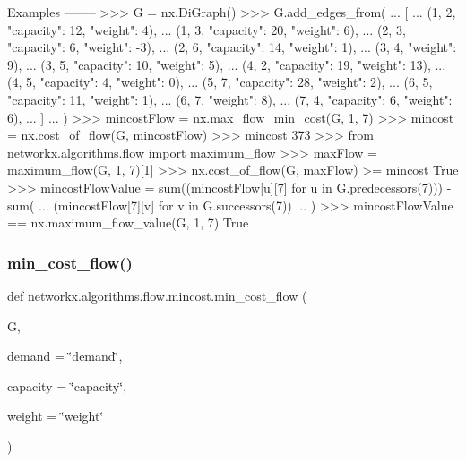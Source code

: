 \begin{DoxyVerb}
Examples
--------
>>> G = nx.DiGraph()
>>> G.add_edges_from(
...     [
...         (1, 2, {"capacity": 12, "weight": 4}),
...         (1, 3, {"capacity": 20, "weight": 6}),
...         (2, 3, {"capacity": 6, "weight": -3}),
...         (2, 6, {"capacity": 14, "weight": 1}),
...         (3, 4, {"weight": 9}),
...         (3, 5, {"capacity": 10, "weight": 5}),
...         (4, 2, {"capacity": 19, "weight": 13}),
...         (4, 5, {"capacity": 4, "weight": 0}),
...         (5, 7, {"capacity": 28, "weight": 2}),
...         (6, 5, {"capacity": 11, "weight": 1}),
...         (6, 7, {"weight": 8}),
...         (7, 4, {"capacity": 6, "weight": 6}),
...     ]
... )
>>> mincostFlow = nx.max_flow_min_cost(G, 1, 7)
>>> mincost = nx.cost_of_flow(G, mincostFlow)
>>> mincost
373
>>> from networkx.algorithms.flow import maximum_flow
>>> maxFlow = maximum_flow(G, 1, 7)[1]
>>> nx.cost_of_flow(G, maxFlow) >= mincost
True
>>> mincostFlowValue = sum((mincostFlow[u][7] for u in G.predecessors(7))) - sum(
...     (mincostFlow[7][v] for v in G.successors(7))
... )
>>> mincostFlowValue == nx.maximum_flow_value(G, 1, 7)
True\end{DoxyVerb}
 \mbox{\label{namespacenetworkx_1_1algorithms_1_1flow_1_1mincost_a891a006d4dc407fcf160c6d6be7e66d4}} 
\subsubsection{\texorpdfstring{min\+\_\+cost\+\_\+flow()}{min\_cost\_flow()}}
{\footnotesize\ttfamily def networkx.\+algorithms.\+flow.\+mincost.\+min\+\_\+cost\+\_\+flow (\begin{DoxyParamCaption}\item[{}]{G,  }\item[{}]{demand = {\ttfamily \char`\"{}demand\char`\"{}},  }\item[{}]{capacity = {\ttfamily \char`\"{}capacity\char`\"{}},  }\item[{}]{weight = {\ttfamily \char`\"{}weight\char`\"{}} }\end{DoxyParamCaption})}

